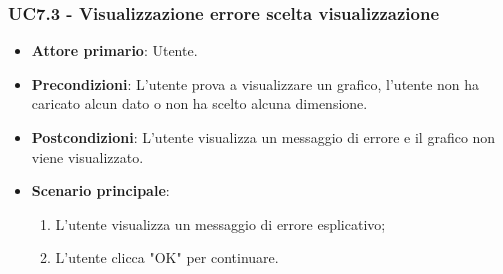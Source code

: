 \subsubsection{UC7.3 - Visualizzazione errore scelta visualizzazione}
\begin{itemize}
	\item \textbf{Attore primario}: Utente.
	\item \textbf{Precondizioni}: L'utente prova a visualizzare un grafico, l'utente non ha caricato alcun dato o non ha scelto alcuna dimensione.
	\item \textbf{Postcondizioni}: L'utente visualizza un messaggio di errore e il grafico non viene visualizzato.
	\item \textbf{Scenario principale}:
		\begin{enumerate}
			\item L'utente visualizza un messaggio di errore esplicativo;
			\item L'utente clicca "OK" per continuare.
		\end{enumerate}
\end{itemize}